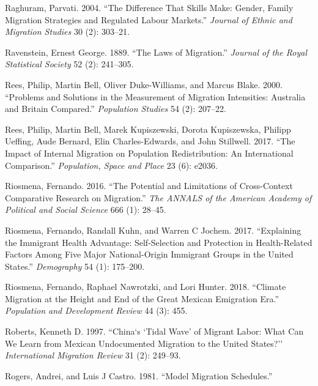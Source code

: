 \documentclass[
]{article}
\begin{document}
\leavevmode\hypertarget{ref-raghuram2004difference}{}%
Raghuram, Parvati. 2004. ``The Difference That Skills Make: Gender,
Family Migration Strategies and Regulated Labour Markets.''
\emph{Journal of Ethnic and Migration Studies} 30 (2): 303--21.

\leavevmode\hypertarget{ref-ravenstein1889laws}{}%
Ravenstein, Ernest George. 1889. ``The Laws of Migration.''
\emph{Journal of the Royal Statistical Society} 52 (2): 241--305.

\leavevmode\hypertarget{ref-rees2000problems}{}%
Rees, Philip, Martin Bell, Oliver Duke-Williams, and Marcus Blake. 2000.
``Problems and Solutions in the Measurement of Migration Intensities:
Australia and Britain Compared.'' \emph{Population Studies} 54 (2):
207--22.

\leavevmode\hypertarget{ref-rees2017impact}{}%
Rees, Philip, Martin Bell, Marek Kupiszewski, Dorota Kupiszewska,
Philipp Ueffing, Aude Bernard, Elin Charles-Edwards, and John Stillwell.
2017. ``The Impact of Internal Migration on Population Redistribution:
An International Comparison.'' \emph{Population, Space and Place} 23
(6): e2036.

\leavevmode\hypertarget{ref-riosmena2016potential}{}%
Riosmena, Fernando. 2016. ``The Potential and Limitations of
Cross-Context Comparative Research on Migration.'' \emph{The ANNALS of
the American Academy of Political and Social Science} 666 (1): 28--45.

\leavevmode\hypertarget{ref-riosmena2017explaining}{}%
Riosmena, Fernando, Randall Kuhn, and Warren C Jochem. 2017.
``Explaining the Immigrant Health Advantage: Self-Selection and
Protection in Health-Related Factors Among Five Major National-Origin
Immigrant Groups in the United States.'' \emph{Demography} 54 (1):
175--200.

\leavevmode\hypertarget{ref-riosmena2018climate}{}%
Riosmena, Fernando, Raphael Nawrotzki, and Lori Hunter. 2018. ``Climate
Migration at the Height and End of the Great Mexican Emigration Era.''
\emph{Population and Development Review} 44 (3): 455.

\leavevmode\hypertarget{ref-roberts1997china}{}%
Roberts, Kenneth D. 1997. ``China`s `Tidal Wave' of Migrant Labor: What
Can We Learn from Mexican Undocumented Migration to the United States?''
\emph{International Migration Review} 31 (2): 249--93.

\leavevmode\hypertarget{ref-rogers1981model}{}%
Rogers, Andrei, and Luis J Castro. 1981. ``Model Migration Schedules.''
\end{document}
